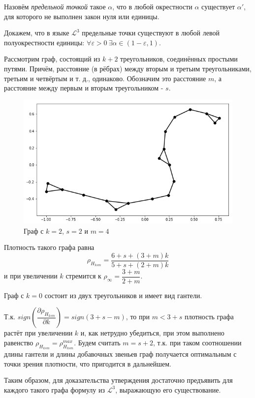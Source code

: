 \Def Назовём \textit{предельной точкой} такое $\alpha$, что в любой окрестности $\alpha$ существует $\alpha'$, для которого не выполнен закон нуля или единицы.

Докажем, что в языке $\mathcal{L}^3$ предельные точки существуют в любой левой полуокрестности единицы: 
$\forall \varepsilon > 0 ~ \exists \alpha \in (1 - \varepsilon, 1)$.

Рассмотрим граф, состоящий из $k+2$ треугольников, соединённых простыми путями.
Причём, расстояние (в рёбрах) между вторым и третьим треугольниками, третьим и четвёртым и т. д., одинаково.
Обозначим это расстояние $m$, а расстояние между первым и вторым треугольником - $s$.

\begin{figure}[h]
    \centering
  \includegraphics[scale=0.4]{picrel/index.png}
  \caption{Граф с $k = 2$, $s = 2$ и $m = 4$}
  \label{fig:chain1}
\end{figure}

Плотность такого графа равна 
$$\rho_{H_{ksm}} = \dfrac{6+s + (3+m)k}{5+s + (2+m)k}$$
и при увеличении $k$ стремится к $\rho_\infty = \dfrac{3+m}{2+m}$.

Граф с $k=0$ состоит из двух треугольников и имеет вид гантели.

Т.к. 
$sign\left(\dfrac{\partial\rho_{H_{ksm}}}{\partial k}\right) = sign(3+s-m)$,
то при $m < 3 + s$ плотность графа растёт при увеличении  $k$ и, как нетрудно убедиться, при этом выполнено равенство
$\rho_{H_{ksm}} = \rho^{max}_{H_{ksm}}$.
Будем считать $m = s+2$, т.к. при таком соотношении длины гантели и длины добавочных звеньев
граф получается оптимальным с точки зрения плотности, что пригодится в дальнейшем.

Таким образом, для доказательства утверждения достаточно предъявить для каждого такого графа формулу из  $\mathcal{L}^3$, выражающую его существование.

